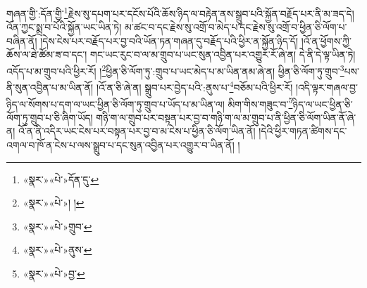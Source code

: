 གཞན་གྱི་:དོན་གྱི་\footnote{«སྣར་»«པེ་»དོན་དུ་}རྗེས་སུ་དཔག་པར་དངོས་པོའི་ཆོས་ཉིད་ལ་བརྟེན་ནས་སྒྲུབ་པའི་སྐྱོན་བརྗོད་པར་ནི་མ་ཟད་དེ། འོན་ཀྱང་སྨྲ་བ་པོའི་སྐྱོན་ཡང་ཡིན་ཏེ། མ་ཚང་བ་དང་རྗེས་སུ་འགྲོ་བ་མེད་པ་དང་རྗེས་སུ་འགྲོ་བ་ཕྱིན་ཅི་ལོག་པ་བཞིན་ནོ། །དེས་ངེས་པར་བརྗོད་པར་བྱ་བའི་ཡོན་ཏན་གཞན་དུ་བརྗོད་པའི་ཕྱིར་ན་སྐྱོན་ཉིད་དོ། །འོ་ན་ཕྱོགས་ཀྱི་ཆོས་ལ་ཐེ་ཚོམ་ཟ་བ་དང་། གང་ཡང་རུང་བ་ལ་མ་གྲུབ་པ་ཡང་སུན་འབྱིན་པར་འགྱུར་རོ་ཞེ་ན། དེ་ནི་དེ་ལྟ་ཡིན་ཏེ། འདོད་པ་མ་གྲུབ་པའི་ཕྱིར་རོ། །\footnote{«སྣར་»«པེ་»། ། }ཕྱིན་ཅི་ལོག་ཏུ་:གྲུབ་པ་ཡང་མེད་པ་མ་ཡིན་ནམ་ཞེ་ན། ཕྱིན་ཅི་ལོག་ཏུ་གྲུབ་\footnote{«སྣར་»«པེ་»གྲུབ་}པས་ནི་སུན་འབྱིན་པ་མ་ཡིན་ནོ། །འོ་ན་ཅི་ཞེ་ན། སྒྲུབ་པར་བྱེད་པའི་:ནུས་པ་\footnote{«སྣར་»«པེ་»ནུས་}བཅོམ་པའི་ཕྱིར་རོ། །འདི་ལྟར་གཞལ་བྱ་ཉིད་ལ་སོགས་པ་དག་ལ་ཡང་ཕྱིན་ཅི་ལོག་ཏུ་གྲུབ་པ་ཡོད་པ་མ་ཡིན་ལ། མིག་གིས་གཟུང་བ་\footnote{«སྣར་»«པེ་»བྱ་}ཉིད་ལ་ཡང་ཕྱིན་ཅི་ལོག་ཏུ་གྲུབ་པ་ཅི་ཞིག་ཡོད། གཉི་ག་ལ་གྲུབ་པར་བསྟན་པར་བྱ་བ་གཉི་ག་ལ་མ་གྲུབ་པ་ནི་ཕྱིན་ཅི་ལོག་ཡིན་ནོ་ཞེ་ན། འོ་ན་ནི་འདིར་ཡང་ངེས་པར་བསྟན་པར་བྱ་བ་མ་ངེས་པ་ཕྱིན་ཅི་ལོག་ཡིན་ནོ། །དེའི་ཕྱིར་གཏན་ཚིགས་དང་འགལ་བ་ཁོ་ན་ངེས་པ་ལས་སྒྲུབ་པ་དང་སུན་འབྱིན་པར་འགྱུར་བ་ཡིན་ནོ། །
